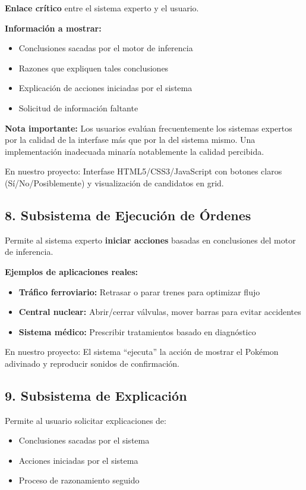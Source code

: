 \documentclass[12pt,a4paper]{article}
\begin{document}
\textbf{Enlace crítico} entre el sistema experto y el usuario.

\textbf{Información a mostrar:}
\begin{itemize}
    \item Conclusiones sacadas por el motor de inferencia
    \item Razones que expliquen tales conclusiones
    \item Explicación de acciones iniciadas por el sistema
    \item Solicitud de información faltante
\end{itemize}

\textbf{Nota importante:} Los usuarios evalúan frecuentemente los sistemas expertos por la calidad de la interfase más que por la del sistema mismo. Una implementación inadecuada minaría notablemente la calidad percibida.

En nuestro proyecto: Interfase HTML5/CSS3/JavaScript con botones claros (Sí/No/Posiblemente) y visualización de candidatos en grid.

\subsection{8. Subsistema de Ejecución de Órdenes}

Permite al sistema experto \textbf{iniciar acciones} basadas en conclusiones del motor de inferencia.

\textbf{Ejemplos de aplicaciones reales:}
\begin{itemize}
    \item \textbf{Tráfico ferroviario:} Retrasar o parar trenes para optimizar flujo
    \item \textbf{Central nuclear:} Abrir/cerrar válvulas, mover barras para evitar accidentes
    \item \textbf{Sistema médico:} Prescribir tratamientos basado en diagnóstico
\end{itemize}

En nuestro proyecto: El sistema ``ejecuta'' la acción de mostrar el Pokémon adivinado y reproducir sonidos de confirmación.

\subsection{9. Subsistema de Explicación}

Permite al usuario solicitar explicaciones de:
\begin{itemize}
    \item Conclusiones sacadas por el sistema
    \item Acciones iniciadas por el sistema
    \item Proceso de razonamiento seguido
\end{itemize}
\end{document}
